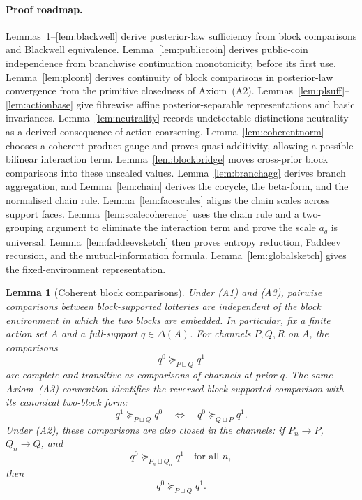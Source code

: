 \documentclass[11pt,a4paper]{article}
\newtheorem{lemma}[theorem]{Lemma}
\theoremstyle{definition}
\newcommand{\1}{\mathbf 1}
\begin{document}
\paragraph{Proof roadmap.}
Lemmas~\ref{lem:blockcoh}--\ref{lem:blackwell} derive posterior-law sufficiency from block comparisons and Blackwell
equivalence.  Lemma~\ref{lem:publiccoin} derives public-coin independence from branchwise continuation monotonicity,
before its first use.  Lemma~\ref{lem:plcont} derives continuity of block comparisons in posterior-law convergence from the
primitive closedness of Axiom~\textup{(A2)}.
Lemmas~\ref{lem:plsuff}--\ref{lem:actionbase} give fibrewise affine posterior-separable representations
and basic invariances.  Lemma~\ref{lem:neutrality} records undetectable-distinctions neutrality as a derived consequence
of action coarsening.  Lemma~\ref{lem:coherentnorm} chooses a coherent product gauge and proves quasi-additivity, allowing
a possible bilinear interaction term.  Lemma~\ref{lem:blockbridge} moves cross-prior block comparisons into these
unscaled values.  Lemma~\ref{lem:branchagg} derives branch aggregation, and Lemma~\ref{lem:chain} derives the cocycle,
the beta-form, and the normalised chain rule.  Lemma~\ref{lem:facescales} aligns the chain scales across support faces.
Lemma~\ref{lem:scalecoherence} uses the chain rule and a two-grouping argument to eliminate the interaction term and prove
the scale $a_q$ is universal.
Lemma~\ref{lem:faddeevsketch} then proves entropy reduction, Faddeev recursion, and the mutual-information formula.
Lemma~\ref{lem:globalsketch} gives the fixed-environment representation.

\begin{lemma}[Coherent block comparisons]\label{lem:blockcoh}
Under \textup{(A1)} and \textup{(A3)}, pairwise comparisons between block-supported lotteries are independent of the block
environment in which the two blocks are embedded.  In particular, fix a finite action set $A$ and a full-support
$q\in\Delta(A)$.  For channels $P,Q,R$ on $A$, the comparisons
\[
q^0\succeq_{P\sqcup Q}q^1
\]
are complete and transitive as comparisons of channels at prior $q$.  The same Axiom~\textup{(A3)} convention identifies
the reversed block-supported comparison with its canonical two-block form:
\[
q^1\succeq_{P\sqcup Q}q^0
\quad\Longleftrightarrow\quad
q^0\succeq_{Q\sqcup P}q^1.
\]
Under \textup{(A2)}, these comparisons are also closed in the channels: if
$P_n\to P$, $Q_n\to Q$, and
\[
q^0\succeq_{P_n\sqcup Q_n}q^1
\quad\text{for all }n,
\]
then
\[
q^0\succeq_{P\sqcup Q}q^1.
\]
\end{lemma}
\end{document}

